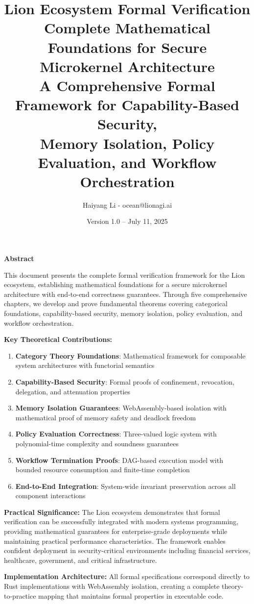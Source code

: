 \documentclass[11pt,a4paper]{book}
\title{
\Large \textbf{Lion Ecosystem Formal Verification} \\
\large Complete Mathematical Foundations for Secure Microkernel Architecture \\
\vspace{0.5cm}
\normalsize A Comprehensive Formal Framework for Capability-Based Security, \\
Memory Isolation, Policy Evaluation, and Workflow Orchestration
}
\author{Haiyang Li - ocean@lionagi.ai}
\date{Version 1.0 -- July 11, 2025}
\theoremstyle{definition}
\theoremstyle{remark}
\newenvironment{abstract}%
{\begin{center}%
\bfseries\abstractname\vspace{-.5em}\vspace{0pt}%
\end{center}%
\list{}{%
\setlength{\leftmargin}{2cm}%
\setlength{\rightmargin}{\leftmargin}%
}%
\item\relax}
{\endlist}
\providecommand{\abstractname}{Abstract}
\begin{document}
\maketitle

\begin{abstract}
This document presents the complete formal verification framework for the Lion ecosystem, establishing mathematical foundations for a secure microkernel architecture with end-to-end correctness guarantees. Through five comprehensive chapters, we develop and prove fundamental theorems covering categorical foundations, capability-based security, memory isolation, policy evaluation, and workflow orchestration.

\textbf{Key Theoretical Contributions:}
\begin{enumerate}
\item \textbf{Category Theory Foundations}: Mathematical framework for composable system architectures with functorial semantics
\item \textbf{Capability-Based Security}: Formal proofs of confinement, revocation, delegation, and attenuation properties
\item \textbf{Memory Isolation Guarantees}: WebAssembly-based isolation with mathematical proof of memory safety and deadlock freedom
\item \textbf{Policy Evaluation Correctness}: Three-valued logic system with polynomial-time complexity and soundness guarantees
\item \textbf{Workflow Termination Proofs}: DAG-based execution model with bounded resource consumption and finite-time completion
\item \textbf{End-to-End Integration}: System-wide invariant preservation across all component interactions
\end{enumerate}

\textbf{Practical Significance:}
The Lion ecosystem demonstrates that formal verification can be successfully integrated with modern systems programming, providing mathematical guarantees for enterprise-grade deployments while maintaining practical performance characteristics. The framework enables confident deployment in security-critical environments including financial services, healthcare, government, and critical infrastructure.

\textbf{Implementation Architecture:}
All formal specifications correspond directly to Rust implementations with WebAssembly isolation, creating a complete theory-to-practice mapping that maintains formal properties in executable code.
\end{abstract}
\end{document}
